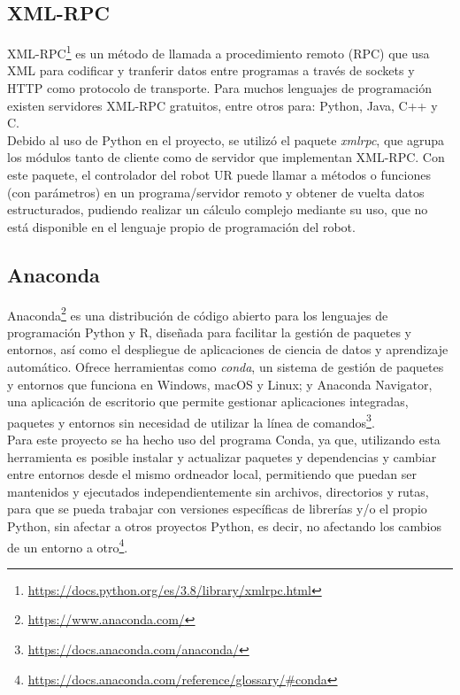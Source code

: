 \subsection{XML-RPC}
\label{sec:XMLRPC}

XML-RPC\footnote{\url{https://docs.python.org/es/3.8/library/xmlrpc.html}} es un método de llamada a procedimiento remoto (RPC) que usa XML para codificar y tranferir datos entre programas a través de sockets y HTTP como protocolo de transporte. Para muchos lenguajes de programación existen servidores XML-RPC gratuitos, entre otros para: Python, Java, C++ y C.\\

Debido al uso de Python en el proyecto, se utilizó el paquete \textit{xmlrpc}, que agrupa los módulos tanto de cliente como de servidor que implementan XML-RPC. Con este paquete, el controlador del robot UR puede llamar a métodos o funciones (con parámetros) en un programa/servidor remoto y obtener de vuelta datos estructurados, pudiendo realizar un cálculo complejo mediante su uso, que no está disponible en el lenguaje propio de programación del robot.

\subsection{Anaconda}
\label{sec:Anaconda}

Anaconda\footnote{\url{https://www.anaconda.com/}} es una distribución de código abierto para los lenguajes de programación Python y R, diseñada para facilitar la gestión de paquetes y entornos, así como el despliegue de aplicaciones de ciencia de datos y aprendizaje automático. Ofrece herramientas como \textit{conda}, un sistema de gestión de paquetes y entornos que funciona en Windows, macOS y Linux; y Anaconda Navigator, una aplicación de escritorio que permite gestionar aplicaciones integradas, paquetes y entornos sin necesidad de utilizar la línea de comandos\footnote{\url{https://docs.anaconda.com/anaconda/}}.\\ 

Para este proyecto se ha hecho uso del programa Conda, ya que, utilizando esta herramienta es posible instalar y actualizar paquetes y dependencias y cambiar entre entornos desde el mismo ordneador local, permitiendo que puedan ser mantenidos y ejecutados independientemente sin archivos, directorios y rutas, para que se pueda trabajar con versiones específicas de librerías y/o el propio Python, sin afectar a otros proyectos Python, es decir, no afectando los cambios de un entorno a otro\footnote{\url{https://docs.anaconda.com/reference/glossary/\#conda}}.

